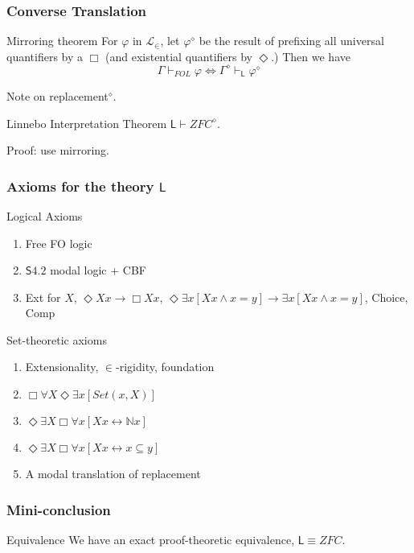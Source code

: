 \documentclass{beamer}
\begin{document}
\begin{frame}
    \frametitle{Converse Translation}
\begin{block}{Mirroring theorem}
 For $\varphi$ in $\mathcal{L}_\in$, let $\varphi^\diamond$ be the result of 
prefixing all universal quantifiers by a $\Box$ 
(and existential quantifiers by $\Diamond$.) Then we have 
\[
    \Gamma \vdash_{FOL} \varphi 
    \Leftrightarrow 
    \Gamma^\diamond \vdash_{\mathsf{L}} \varphi^\diamond
\]
\end{block}
 Note on replacement$^\diamond$.
\begin{block}{Linnebo Interpretation Theorem}
  $\mathsf{L} \vdash ZFC^\diamond$.  
\end{block}
 Proof: use mirroring.
\end{frame}
\begin{frame}
    \frametitle{Axioms for the theory $\mathsf{L}$}
    \begin{block}{Logical Axioms}
    \begin{enumerate}
        \item Free FO logic
        \item $\mathsf{S4.2}$ modal logic + CBF
        \item Ext for $X$, $\Diamond Xx \rightarrow \Box Xx$, 
        $\Diamond \exists x[Xx \wedge x = y] \rightarrow \exists x[Xx \wedge x = y]$,
        Choice, Comp
    \end{enumerate}
    \end{block}
    \begin{block}{Set-theoretic axioms}
        \begin{enumerate}
        \item Extensionality, $\in$-rigidity, foundation
        \item $\Box \forall X \Diamond \exists x [Set(x, X)]$
        \item $\Diamond \exists X \Box \forall x[Xx \leftrightarrow \mathbb{N}x]$
        \item $\Diamond \exists X \Box \forall x[Xx \leftrightarrow x \subseteq y]$
        \item A modal translation of replacement
        \end{enumerate}
    \end{block}
\end{frame}

\begin{frame}
    \frametitle{Mini-conclusion}
\begin{block}{Equivalence}
    We have an exact proof-theoretic equivalence, $\mathsf{L} \equiv ZFC$.
\end{block}
\end{frame}
\end{document}
